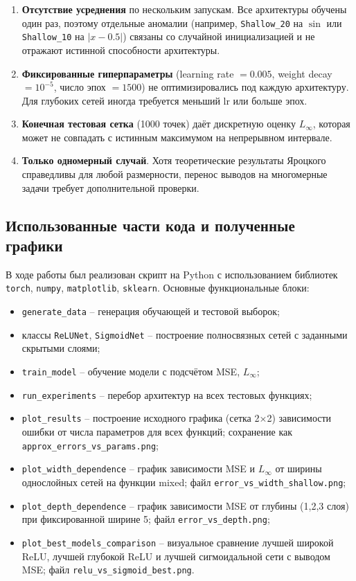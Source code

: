 \documentclass[12pt]{article}
\begin{document}
	\begin{enumerate}
		\item \textbf{Отсутствие усреднения} по нескольким запускам. Все архитектуры обучены один раз, поэтому отдельные аномалии (например, \texttt{Shallow\_20} на $\sin$ или \texttt{Shallow\_10} на $|x-0.5|$) связаны со случайной инициализацией и не отражают истинной способности архитектуры.
		\item \textbf{Фиксированные гиперпараметры} (learning rate $=0.005$, weight decay $=10^{-5}$, число эпох $=1500$) не оптимизировались под каждую архитектуру. Для глубоких сетей иногда требуется меньший lr или больше эпох.
		\item \textbf{Конечная тестовая сетка} (1000 точек) даёт дискретную оценку $L_{\infty}$, которая может не совпадать с истинным максимумом на непрерывном интервале.
		\item \textbf{Только одномерный случай}. Хотя теоретические результаты Яроцкого справедливы для любой размерности, перенос выводов на многомерные задачи требует дополнительной проверки.
	\end{enumerate}
	
	\subsection{Использованные части кода и полученные графики}
	
	В ходе работы был реализован скрипт на Python с использованием библиотек \texttt{torch}, \texttt{numpy}, \texttt{matplotlib}, \texttt{sklearn}. Основные функциональные блоки:
	
	\begin{itemize}
		\item \texttt{generate\_data} -- генерация обучающей и тестовой выборок;
		\item классы \texttt{ReLUNet}, \texttt{SigmoidNet} -- построение полносвязных сетей с заданными скрытыми слоями;
		\item \texttt{train\_model} -- обучение модели с подсчётом MSE, $L_{\infty}$;
		\item \texttt{run\_experiments} -- перебор архитектур на всех тестовых функциях;
		\item \texttt{plot\_results} -- построение исходного графика (сетка 2×2) зависимости ошибки от числа параметров для всех функций; сохранение как \texttt{approx\_errors\_vs\_params.png};
		\item \texttt{plot\_width\_dependence} -- график зависимости MSE и $L_{\infty}$ от ширины однослойных сетей на функции mixed; файл \texttt{error\_vs\_width\_shallow.png};
		\item \texttt{plot\_depth\_dependence} -- график зависимости MSE от глубины (1,2,3 слоя) при фиксированной ширине 5; файл \texttt{error\_vs\_depth.png};
		\item \texttt{plot\_best\_models\_comparison} -- визуальное сравнение лучшей широкой ReLU, лучшей глубокой ReLU и лучшей сигмоидальной сети с выводом MSE; файл \texttt{relu\_vs\_sigmoid\_best.png}.
	\end{itemize}
\end{document}
